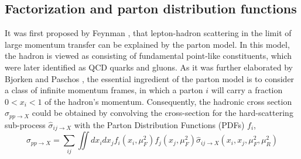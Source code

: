 \subsection{Factorization and parton distribution functions}\label{subsec:PDF}
\noindent It was first proposed by Feynman \cite{Feynman_51}, that lepton-hadron scattering in the limit of large momentum transfer can be explained by the parton model. In this model, the hadron is viewed as consisting of fundamental point-like constituents, which were later identified as QCD quarks and gluons. As it was further elaborated by Bjorken and Paschos \cite{Bjorken_52}, the essential ingredient of the parton model is to consider a class of infinite momentum frames, in which a parton $i$ will carry a fraction $0<x_i<1$ of the hadron's momentum. Consequently, the hadronic cross section $\sigma_{pp\rightarrow X}$ could be obtained by convolving the cross-section for the hard-scattering sub-process $\hat{\sigma}_{ij\rightarrow X}$ with the Parton Distribution Functions (PDFs) $f_i$,
\begin{equation}\label{eq:sigma_2}
    \sigma_{pp\rightarrow X} =\sum_{ij} \iint dx_i dx_j f_i(x_i, \mu_F^2)f_j(x_j,\mu_F^2)\hat{\sigma}_{ij\rightarrow X}(x_i,x_j, \mu_F^2, \mu_R^2)
\end{equation}

